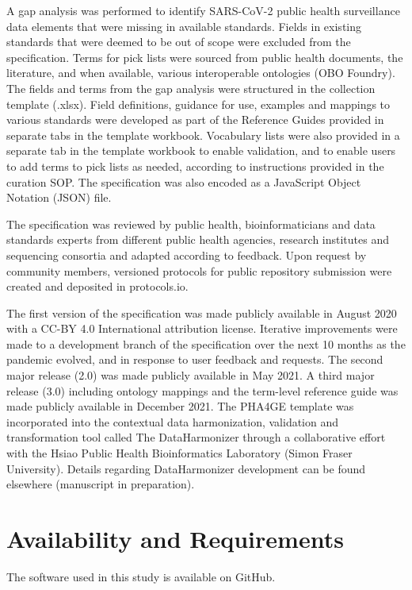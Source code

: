 A gap analysis was performed to identify SARS-CoV-2 public health surveillance data elements that were missing in available standards. Fields in existing standards that were deemed to be out of scope were excluded from the specification. Terms for pick lists were sourced from public health documents, the literature, and when available, various interoperable ontologies (OBO Foundry). The fields and terms from the gap analysis were structured in the collection template (.xlsx). Field definitions, guidance for use, examples and mappings to various standards were developed as part of the Reference Guides provided in separate tabs in the template workbook. Vocabulary lists were also provided in a separate tab in the template workbook to enable validation, and to enable users to add terms to pick lists as needed, according to instructions provided in the curation SOP. The specification was also encoded as a JavaScript Object Notation (JSON) file. 

The specification was reviewed by public health, bioinformaticians and data standards experts from different public health agencies, research institutes and sequencing consortia and adapted according to feedback. Upon request by community members, versioned protocols for public repository submission were created and deposited in protocols.io.

The first version of the specification was made publicly available in August 2020 with a CC-BY 4.0 International attribution license. Iterative improvements were made to a development branch of the specification over the next 10 months as the pandemic evolved, and in response to user feedback and requests. The second major release (2.0) was made publicly available in May 2021. A third major release (3.0) including ontology mappings and the term-level reference guide was made publicly available in December 2021. The PHA4GE template was incorporated into the contextual data harmonization, validation and transformation tool called The DataHarmonizer through a collaborative effort with the Hsiao Public Health Bioinformatics Laboratory (Simon Fraser University). Details regarding DataHarmonizer development can be found elsewhere (manuscript in preparation).

\section{Availability and Requirements}

The software used in this study is available on GitHub. 

